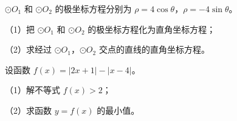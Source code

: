 \begin{question}
$\odot O_1$ 和 $\odot O_2$ 的极坐标方程分别为 $\rho=4\cos\theta$，$\rho=-4\sin\theta$。

（1）把 $\odot O_1$ 和 $\odot O_2$ 的极坐标方程化为直角坐标方程；

（2）求经过 $\odot O_1$，$\odot O_2$ 交点的直线的直角坐标方程。

\end{question}
\begin{question}
设函数 $f(x)=|2x+1|-|x-4|$。

（1）解不等式 $f(x)>2$；

（2）求函数 $y=f(x)$ 的最小值。

\end{question}